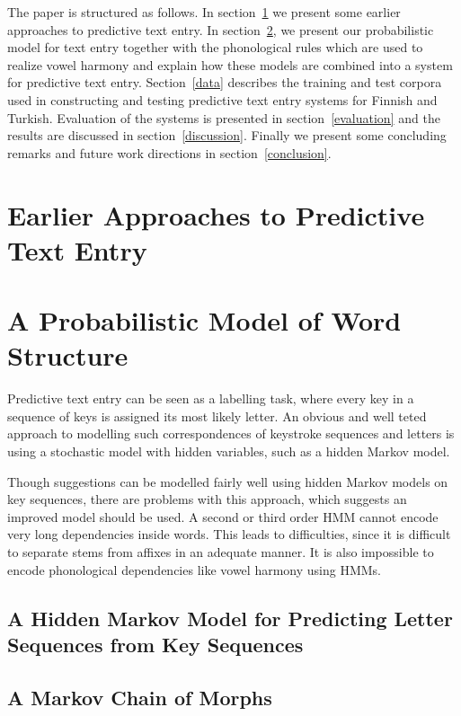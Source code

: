 \documentclass{llncs}
\begin{document}
The paper is structured as follows. In section~\ref{earlier-work} we
present some earlier approaches to predictive text entry. In
section~\ref{model}, we present our probabilistic model for text entry
together with the phonological rules which are used to realize vowel
harmony and explain how these models are combined into a system for
predictive text entry. Section~\ref{data} describes the training and
test corpora used in constructing and testing predictive text entry
systems for Finnish and Turkish. Evaluation of the systems is
presented in section~\ref{evaluation} and the results are discussed in
section~\ref{discussion}. Finally we present some concluding remarks
and future work directions in section~\ref{conclusion}.

\section{Earlier Approaches to Predictive Text Entry}\label{earlier-work}


\section{A Probabilistic Model of Word Structure}\label{model}

Predictive text entry can be seen as a labelling task, where every key
in a sequence of keys is assigned its most likely letter. An obvious
and well teted approach to modelling such correspondences of keystroke
sequences and letters is using a stochastic model with hidden
variables, such as a hidden Markov model.

Though suggestions can be modelled fairly well using hidden Markov
models on key sequences, there are problems with this approach, which
suggests an improved model should be used. A second or third order HMM
cannot encode very long dependencies inside words. This leads to
difficulties, since it is difficult to separate stems from affixes in
an adequate manner. It is also impossible to encode phonological
dependencies like vowel harmony using HMMs.

\subsection{A Hidden Markov Model for Predicting Letter Sequences from Key Sequences}

\subsection{A Markov Chain of Morphs}
\end{document}
